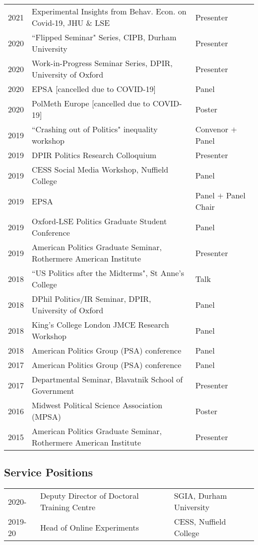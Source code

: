 \documentclass[11pt, a4paper]{article}
\begin{document}
 \begin{tabular}{lll}
     2021 &  Experimental Insights from Behav. Econ. on Covid-19, JHU \& LSE & Presenter \\
     2020 & ``Flipped Seminar" Series, CIPB, Durham University & Presenter \\
     2020 & Work-in-Progress Seminar Series, DPIR, University of Oxford & Presenter \\
     2020 & EPSA [cancelled due to COVID-19] & Panel \\
     2020 & PolMeth Europe [cancelled due to COVID-19] & Poster \\
     2019 & ``Crashing out of Politics" inequality workshop & Convenor $+$ Panel \\
     2019 & DPIR Politics Research Colloquium & Presenter \\
     2019 & CESS Social Media Workshop, Nuffield College & Panel \\
     2019 & EPSA  & Panel $+$ Panel Chair \\
     2019 & Oxford-LSE Politics Graduate Student Conference & Panel \\
     2019 & American Politics Graduate Seminar, Rothermere American Institute & Presenter \\
     2018 & ``US Politics after the Midterms", St Anne's College & Talk \\
     2018 & DPhil Politics/IR Seminar, DPIR, University of Oxford & Panel \\
     2018 & King's College London JMCE Research Workshop & Panel \\
     2018 & American Politics Group (PSA) conference & Panel \\
     2017 & American Politics Group (PSA) conference & Panel \\
     2017 & Departmental Seminar, Blavatnik School of Government & Presenter \\
     2016 & Midwest Political Science Association (MPSA) & Poster \\
     2015 & American Politics Graduate Seminar, Rothermere American Institute & Presenter
 \end{tabular}

 \subsection*{Service Positions}

 \begin{tabular}{lll}
   2020- & Deputy Director of Doctoral Training Centre & SGIA, Durham University \\
   2019-20 & Head of Online Experiments & CESS, Nuffield College \\
   
 \end{tabular}
\end{document}
